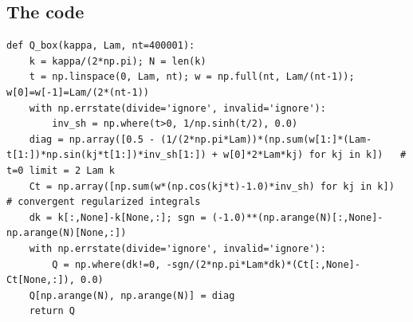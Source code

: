 \documentclass[11pt]{article}
\newcommand{\file}[1]{\texttt{\detokenize{#1}}}
\begin{document}


\subsection{The code}

\begin{lstlisting}[caption={\file{numerics/compression_box.py}, lines 10--23},captionpos=b]
def Q_box(kappa, Lam, nt=400001):
    k = kappa/(2*np.pi); N = len(k)
    t = np.linspace(0, Lam, nt); w = np.full(nt, Lam/(nt-1)); w[0]=w[-1]=Lam/(2*(nt-1))
    with np.errstate(divide='ignore', invalid='ignore'):
        inv_sh = np.where(t>0, 1/np.sinh(t/2), 0.0)
    diag = np.array([0.5 - (1/(2*np.pi*Lam))*(np.sum(w[1:]*(Lam-t[1:])*np.sin(kj*t[1:])*inv_sh[1:]) + w[0]*2*Lam*kj) for kj in k])   # t=0 limit = 2 Lam k
    Ct = np.array([np.sum(w*(np.cos(kj*t)-1.0)*inv_sh) for kj in k])          # convergent regularized integrals
    dk = k[:,None]-k[None,:]; sgn = (-1.0)**(np.arange(N)[:,None]-np.arange(N)[None,:])
    with np.errstate(divide='ignore', invalid='ignore'):
        Q = np.where(dk!=0, -sgn/(2*np.pi*Lam*dk)*(Ct[:,None]-Ct[None,:]), 0.0)
    Q[np.arange(N), np.arange(N)] = diag
    return Q
\end{lstlisting}
\end{document}
